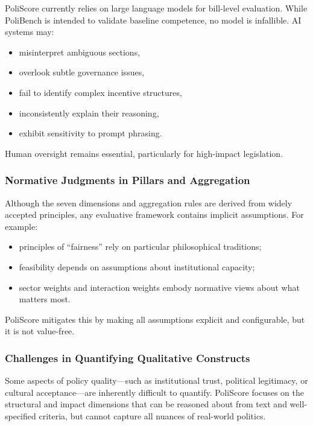 \documentclass[12pt]{article}
\begin{document}
PoliScore currently relies on large language models for bill-level evaluation. While PoliBench is
intended to validate baseline competence, no model is infallible. AI systems may:

\begin{itemize}
    \item misinterpret ambiguous sections,
    \item overlook subtle governance issues,
    \item fail to identify complex incentive structures,
    \item inconsistently explain their reasoning,
    \item exhibit sensitivity to prompt phrasing.
\end{itemize}

Human oversight remains essential, particularly for high-impact legislation.

\subsubsection{Normative Judgments in Pillars and Aggregation}

Although the seven dimensions and aggregation rules are derived from widely accepted principles, any evaluative framework
contains implicit assumptions. For example:

\begin{itemize}
    \item principles of ``fairness'' rely on particular philosophical traditions;
    \item feasibility depends on assumptions about institutional capacity;
    \item sector weights and interaction weights embody normative views about what matters most.
\end{itemize}

PoliScore mitigates this by making all assumptions explicit and configurable, but it is not value-free.

\subsubsection{Challenges in Quantifying Qualitative Constructs}

Some aspects of policy quality---such as institutional trust, political legitimacy, or cultural acceptance---are inherently
difficult to quantify. PoliScore focuses on the structural and impact dimensions that can be reasoned about from text and
well-specified criteria, but cannot capture all nuances of real-world politics.
\end{document}
